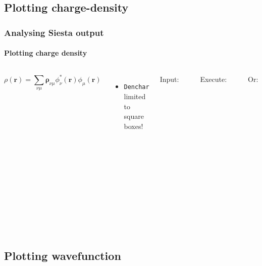 \subsection{Plotting charge-density}

\begin{frame}[fragile]
  \frametitle{Analysing Siesta output}
  \framesubtitle{Plotting charge density}

  \begin{columns}

    \begin{equation*}
      \rho(\mathbf r) = \sum_{\nu\mu} \boldsymbol\rho_{\nu\mu}\phi^*_\nu(\mathbf
      r)\phi_\mu(\mathbf r)
    \end{equation*}

    \begin{itemize}
      \item \texttt{Denchar} limited to square boxes!
    \end{itemize}
    
    
  \footnotesize
  Input:
\begin{verbatim}
  Write.Denchar true
  Denchar.TypeOfRun 3D
  Denchar.PlotCharge true
\end{verbatim}
  Execute:
\begin{verbatim}
  siesta RUN.fdf
  denchar < RUN.fdf
\end{verbatim}

  Or:
\begin{verbatim}
 grid2cube << EOL
   h2o
   drho
   3. 3. 3.
   1
   unformatted
  EOL
\end{verbatim}


  
\end{columns}
\end{frame}




\subsection{Plotting wavefunction}

